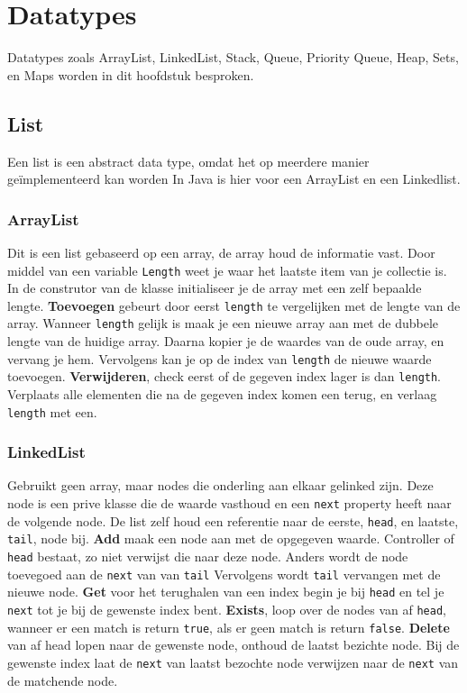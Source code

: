 \section{Datatypes}
Datatypes zoals ArrayList, LinkedList, Stack, Queue, Priority Queue, Heap, Sets, en Maps worden in dit hoofdstuk besproken.

\subsection{List}
Een list is een abstract data type, omdat het op meerdere manier geïmplementeerd kan worden
In Java is hier voor een ArrayList en een Linkedlist.

\subsubsection{ArrayList}
Dit is een list gebaseerd op een array, de array houd de informatie vast.
Door middel van een variable \texttt{Length} weet je waar het laatste item van je collectie is.
In de construtor van de klasse initialiseer je de array met een zelf bepaalde lengte.
\textbf{Toevoegen} gebeurt door eerst \texttt{length} te vergelijken met de lengte van de array.
Wanneer \texttt{length} gelijk is maak je een nieuwe array aan met de dubbele lengte van de huidige array.
Daarna kopier je de waardes van de oude array, en vervang je hem.
Vervolgens kan je op de index van \texttt{length} de nieuwe waarde toevoegen.
\textbf{Verwijderen}, check eerst of de gegeven index lager is dan \texttt{length}.
Verplaats alle elementen die na de gegeven index komen een terug, en verlaag \texttt{length} met een.

\subsubsection{LinkedList}
Gebruikt geen array, maar nodes die onderling aan elkaar gelinked zijn.
Deze node is een prive klasse die de waarde vasthoud en een \texttt{next} property heeft naar de volgende node.
De list zelf houd een referentie naar de eerste, \texttt{head}, en laatste, \texttt{tail}, node bij.
\textbf{Add} maak een node aan met de opgegeven waarde.
Controller of \texttt{head} bestaat, zo niet verwijst die naar deze node.
Anders wordt de node toevegoed aan de \texttt{next} van van \texttt{tail}
Vervolgens wordt \texttt{tail} vervangen met de nieuwe node.
\textbf{Get} voor het terughalen van een index begin je bij \texttt{head} en tel je \texttt{next} tot je bij de gewenste index bent.
\textbf{Exists}, loop over de nodes van af \texttt{head}, wanneer er een match is return \texttt{true}, als er geen match is return \texttt{false}.
\textbf{Delete} van af head lopen naar de gewenste node, onthoud de laatst bezichte node. Bij de gewenste index laat de \texttt{next} van laatst bezochte node verwijzen naar de \texttt{next} van de matchende node.

